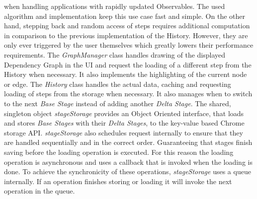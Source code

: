 when handling applications with rapidly updated Observables. The used algorithm and implementation keep this use case fast and simple. On the other hand, stepping back and random access of steps requires additional computation in comparison to the previous implementation of the History. However, they are only ever triggered by the user themselves which greatly lowers their performance requirements.
The \emph{GraphManager} class handles drawing of the displayed Dependency Graph in the UI and request the loading of a different step from the History when necessary. It also implements the highlighting of the current node or edge. The \emph{History} class handles the actual data, caching and requesting loading of steps from the storage when necessary. It also manages when to switch to the next \emph{Base Stage} instead of adding another \emph{Delta Stage}. The shared, singleton object \emph{stageStorage} provides an Object Oriented interface, that loads and stores \emph{Base Stages} with their \emph{Delta Stages}, to the key-value based Chrome storage API. \emph{stageStorage} also schedules request internally to ensure that they are handled sequentially and in the correct order. Guaranteeing that stages finish saving before the loading operation is executed. For this reason the loading operation is asynchronous and uses a callback that is invoked when the loading is done. To achieve the synchronicity of these operations, \emph{stageStorage} uses a queue internally. If an operation finishes storing or loading it will invoke the next operation in the queue.	
	
